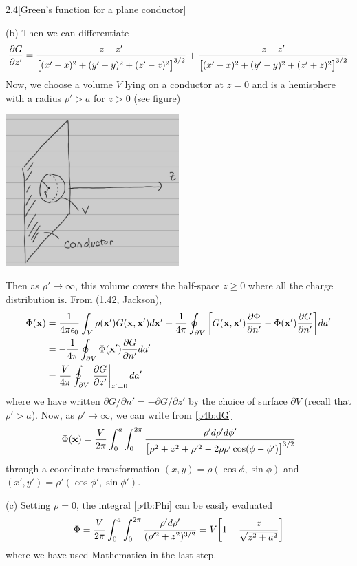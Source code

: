 \documentclass[12pt]{article}
\begin{document}
\begin{problem}{2.4}[Green's function for a plane conductor]
\begin{solution}
(b) Then we can differentiate
\begin{equation}\label{p4b:dG}
    \frac{\partial G}{\partial z'}
    =\frac{z-z'}{\qty[(x'-x)^2+(y'-y)^2+(z'-z)^2]^{3/2}}
    +\frac{z+z'}{\qty[(x'-x)^2+(y'-y)^2+(z'+z)^2]^{3/2}}
\end{equation}
Now, we choose a volume $V$ lying on a conductor at $z=0$
and is a hemisphere with a radius $\rho'> a$ for $z>0$ (see figure)
\begin{center}
    \includegraphics[width=0.5\textwidth]{hw2_p4.jpg} 
\end{center}
Then as $\rho'\to\infty$, this volume covers the half-space $z\geq0$ where all
the charge distribution is. From (1.42, Jackson),
\begin{align}
    \Phi(\vb{x})
    &=\frac1{4\pi\epsilon_0}\int_V\rho(\vb{x}')G(\vb{x},\vb{x}')d\vb{x}'
    +\frac1{4\pi}\oint_{\partial
    V}\qty[G(\vb{x},\vb{x}')\frac{\partial\Phi}{\partial
n'}-\Phi(\vb{x}')\frac{\partial G}{\partial n'}]da'\notag\\
    &=-\frac1{4\pi}\oint_{\partial V}\Phi(\vb{x}')\frac{\partial G}{\partial
    n'}da'\notag\\
    &=\frac{V}{4\pi}\oint_{\partial V}\eval{\frac{\partial G}{\partial
    z'}}_{z'=0}da'
\end{align}
where we have written $\partial G/\partial n'=-\partial G/\partial z'$ by the
choice of surface $\partial V$ (recall that $\rho'> a$). Now, as
$\rho'\to\infty$, we can write from \eqref{p4b:dG}
\begin{align}\label{p4b:Phi}
    \Phi(\vb{x})=\frac{V}{2\pi}\int_0^a\int_0^{2\pi}
    \frac{\rho'd\rho'd\phi'}{\qty[\rho^2+z^2+\rho'^2-2\rho\rho'\cos(\phi-\phi')]^{3/2}}
\end{align}
through a coordinate transformation $(x,y)=\rho(\cos\phi,\sin\phi)$ and $(x',y')=\rho'(\cos\phi',\sin\phi')$.

(c) Setting $\rho=0$, the integral \eqref{p4b:Phi} can be easily evaluated
\begin{align}
    \Phi=\frac{V}{2\pi}\int_0^a\int_0^{2\pi}\frac{\rho'd\rho'}{(\rho'^2+z^2)^{3/2}}=V\qty[1-\frac{z}{\sqrt{z^2+a^2}}] 
\end{align}
where we have used Mathematica in the last step.


\end{solution}
\end{problem}
\end{document}
